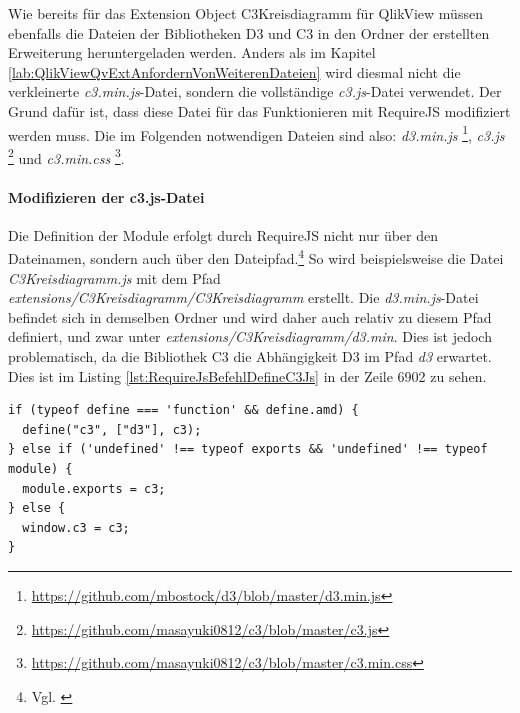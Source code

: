 Wie bereits für das Extension Object C3Kreisdiagramm für QlikView müssen ebenfalls die Dateien der Bibliotheken D3 und C3 in den Ordner der erstellten Erweiterung heruntergeladen werden. Anders als im Kapitel \ref{lab:QlikViewQvExtAnfordernVonWeiterenDateien} wird diesmal nicht die verkleinerte \textit{c3.min.js}-Datei, sondern die vollständige \textit{c3.js}-Datei verwendet. Der Grund dafür ist, dass diese Datei für das Funktionieren mit RequireJS modifiziert werden muss.
Die im Folgenden notwendigen Dateien sind also: \textit{d3.min.js} \footnote{\url{https://github.com/mbostock/d3/blob/master/d3.min.js}}, \textit{c3.js} \footnote{\url{https://github.com/masayuki0812/c3/blob/master/c3.js}} und \textit{c3.min.css} \footnote{\url{https://github.com/masayuki0812/c3/blob/master/c3.min.css}}.

\paragraph{Modifizieren der c3.js-Datei }

Die Definition der Module erfolgt durch RequireJS nicht nur über den Dateinamen, sondern auch über den Dateipfad.\footnote{Vgl. \cite{RequireJSAPILoadJavaScriptFiles}} So wird beispielsweise die Datei \textit{C3Kreisdiagramm.js} mit dem Pfad \textit{extensions/C3Kreisdiagramm/C3Kreisdiagramm} erstellt. Die \textit{d3.min.js}-Datei befindet sich in demselben Ordner und wird daher auch relativ zu diesem Pfad definiert, und zwar unter \textit{extensions/C3Kreisdiagramm/d3.min}. Dies ist jedoch problematisch, da die Bibliothek C3 die Abhängig\-keit D3 im Pfad \textit{d3} erwartet. Dies ist im Listing \ref{lst:RequireJsBefehlDefineC3Js} in der Zeile 6902 zu sehen.

\ifIncludeFigures\begin{listing}[htbp]
\begin{verbatim}
if (typeof define === 'function' && define.amd) {
  define("c3", ["d3"], c3);
} else if ('undefined' !== typeof exports && 'undefined' !== typeof module) {
  module.exports = c3;
} else {
  window.c3 = c3;
}
\end{verbatim}
\caption[RequireJS-Befehl \textit{define} in der C3.js-Bibliothek]{RequireJS-Befehl \textit{define} in der C3.js-Bibliothek der Version 0.4.9, c3.js, \\Quelle: \cite{c3masayuki0812c3}}
\label{lst:RequireJsBefehlDefineC3Js}
\end{listing}\fi


